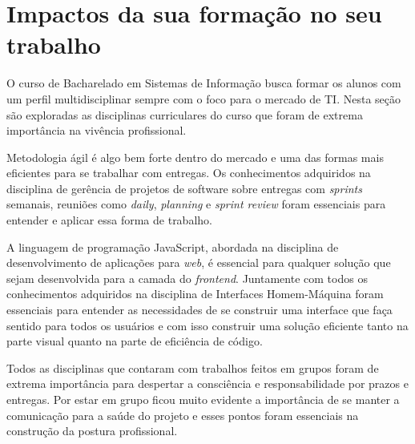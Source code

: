 \section{Impactos da sua formação no seu trabalho}
\label{sec:impactos}

{
O curso de Bacharelado em Sistemas de Informação busca formar os alunos com um perfil multidisciplinar sempre com o foco para o mercado de TI. Nesta seção são exploradas as disciplinas curriculares do curso que foram de extrema importância na vivência profissional.

Metodologia ágil é algo bem forte dentro do mercado e uma das formas mais eficientes para se trabalhar com entregas. Os conhecimentos adquiridos na disciplina de gerência de projetos de software sobre entregas com \textit{sprints} semanais,  reuniões como \textit{daily}, \textit{planning} e \textit{sprint review} foram essenciais para entender e aplicar essa forma de trabalho.

A linguagem de programação JavaScript, abordada na disciplina de desenvolvimento de aplicações para \textit{web}, é essencial para qualquer solução que sejam desenvolvida para a camada do \textit{frontend}. Juntamente com todos os conhecimentos adquiridos na disciplina de Interfaces Homem-Máquina foram essenciais para entender as necessidades de se construir uma interface que faça sentido para todos os usuários e com isso construir uma solução eficiente tanto na parte visual quanto na parte de eficiência de código.  

Todos as disciplinas que contaram com trabalhos feitos em grupos foram de extrema importância para despertar a consciência e responsabilidade por prazos e entregas. Por estar em grupo ficou muito evidente a importância de se manter a comunicação para a saúde do projeto e esses pontos foram essenciais na construção da postura profissional.
}